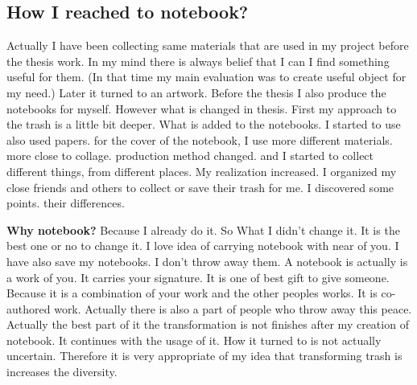 \subsection{How I reached to notebook?}
Actually I have been collecting same materials that are used in my project before the thesis work. In my mind there is always belief that I can I find something useful for them. (In that time my main evaluation was to create useful object for my need.) Later it turned to an artwork. Before the thesis I also produce the notebooks for myself. However what is changed in thesis. First my approach to the trash is a little bit deeper. What is added to the notebooks. I started to use also used papers. for the cover of the notebook, I use more different materials. more close to collage. production method changed. and I started to collect different things, from different places. My realization increased. I organized my close friends and others to collect or save their trash for me. I discovered some points. their differences. 


\textbf{Why notebook?} Because I already do it. So What I didn't change it. It is the best one or no to change it. I love idea of carrying notebook with near of you. I have also save my notebooks. I don't throw away them. A notebook is actually is a work of you. It carries your signature. It is one of best gift to give someone. Because it is a combination of your work and the other peoples works. It is co-authored work. Actually there is also a part of people who throw away this peace. Actually the best part of it the transformation is not finishes after my creation of notebook. It continues with the usage of it. How it turned to is not actually uncertain. Therefore it is very appropriate of my idea that transforming trash is increases the diversity.

